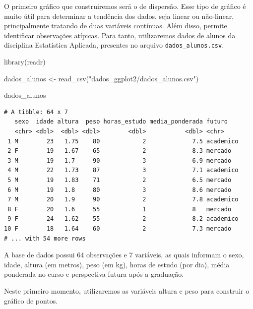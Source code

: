 \documentclass[
  brazilian,
]{book}
\newenvironment{Shaded}{\begin{snugshade}}{\end{snugshade}}
\newcommand{\FunctionTok}[1]{\textcolor[rgb]{0.00,0.00,0.00}{#1}}
\newcommand{\NormalTok}[1]{#1}
\newcommand{\OtherTok}[1]{\textcolor[rgb]{0.56,0.35,0.01}{#1}}
\newcommand{\StringTok}[1]{\textcolor[rgb]{0.31,0.60,0.02}{#1}}
\begin{document}
O primeiro gráfico que construiremos será o de dispersão. Esse tipo de gráfico é muito útil para determinar a tendência dos dados, seja linear ou não-linear, principalmente tratando de duas variáveis contínuas. Além disso, permite identificar observações atípicas. Para tanto, utilizaremos dados de alunos da disciplina Estatística Aplicada, presentes no arquivo \texttt{dados\_alunos.csv}.

\begin{Shaded}
\begin{Highlighting}[]
\FunctionTok{library}\NormalTok{(readr)}

\NormalTok{dados\_alunos }\OtherTok{\textless{}{-}} \FunctionTok{read\_csv}\NormalTok{(}\StringTok{"dados\_ggplot2/dados\_alunos.csv"}\NormalTok{)}
\end{Highlighting}
\end{Shaded}

\begin{Shaded}
\begin{Highlighting}[]
\NormalTok{dados\_alunos}
\end{Highlighting}
\end{Shaded}

\begin{verbatim}
# A tibble: 64 x 7
   sexo  idade altura  peso horas_estudo media_ponderada futuro   
   <chr> <dbl>  <dbl> <dbl>        <dbl>           <dbl> <chr>    
 1 M        23   1.75    80            2             7.5 academico
 2 F        19   1.67    65            2             8.3 mercado  
 3 M        19   1.7     90            3             6.9 mercado  
 4 M        22   1.73    87            3             7.1 academico
 5 M        19   1.83    71            2             6.5 mercado  
 6 M        19   1.8     80            3             8.6 mercado  
 7 M        20   1.9     90            2             7.8 academico
 8 F        20   1.6     55            1             8   mercado  
 9 F        24   1.62    55            2             8.2 academico
10 F        18   1.64    60            2             7.3 mercado  
# ... with 54 more rows
\end{verbatim}

A base de dados possui 64 observações e 7 variáveis, as quais informam o sexo, idade, altura (em metros), peso (em kg), horas de estudo (por dia), média ponderada no curso e perspectiva futura após a graduação.

Neste primeiro momento, utilizaremos as variáveis altura e peso para construir o gráfico de pontos.
\end{document}
